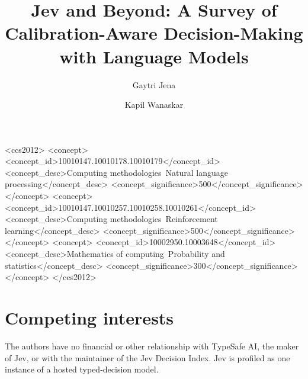 \documentclass[acmsmall,screen,nonacm]{acmart}
\begin{document}
\title[Jev and Beyond: A Survey of Calibration-Aware Decision-Making]{Jev and Beyond: A Survey of Calibration-Aware Decision-Making with Language Models}

\author{Gaytri Jena}
\author{Kapil Wanaskar}
\authornotemark[1]
\renewcommand{\shortauthors}{Jena and Wanaskar}



\begin{CCSXML}
<ccs2012>
   <concept>
       <concept_id>10010147.10010178.10010179</concept_id>
       <concept_desc>Computing methodologies~Natural language processing</concept_desc>
       <concept_significance>500</concept_significance>
   </concept>
   <concept>
       <concept_id>10010147.10010257.10010258.10010261</concept_id>
       <concept_desc>Computing methodologies~Reinforcement learning</concept_desc>
       <concept_significance>500</concept_significance>
   </concept>
   <concept>
       <concept_id>10002950.10003648</concept_id>
       <concept_desc>Mathematics of computing~Probability and statistics</concept_desc>
       <concept_significance>300</concept_significance>
   </concept>
</ccs2012>
\end{CCSXML}


\maketitle






\FloatBarrier   %



\section*{Competing interests}
The authors have no financial or other relationship with TypeSafe AI, the maker of Jev, or with the
maintainer of the Jev Decision Index. Jev is profiled as one instance of a hosted typed-decision model.




\clearpage
\appendix

\end{document}
